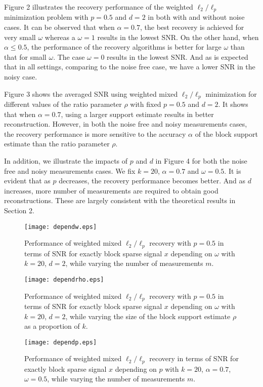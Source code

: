 \documentclass[11pt]{article}
\begin{document}
Figure 2 illustrates the recovery performance of the weighted $\ell_2/\ell_p$ minimization problem with $p=0.5$ and $d=2$ in both with and without noise cases. It can be observed that when $\alpha=0.7$, the best recovery is achieved for very small $\omega$ whereas a $\omega=1$ results in the lowest SNR. On the other hand, when $\alpha\leq 0.5$, the performance of the recovery algorithms is better for large $\omega$ than that for small $\omega$. The case $\omega=0$ results in the lowest SNR. And as is expected that in all settings, comparing to the noise free case, we have a lower SNR in the noisy case. 

Figure 3 shows the averaged SNR using weighted mixed $\ell_2/\ell_p$ minimization for different values of the ratio parameter $\rho$ with fixed $p=0.5$ and $d=2$. It shows that when $\alpha=0.7$, using a larger support estimate results in better reconstruction. However, in both the noise free and noisy measurements cases, the recovery performance is more sensitive to the accuracy $\alpha$ of the block support estimate than the ratio parameter $\rho$.

In addition, we illustrate the impacts of $p$ and $d$ in Figure 4 for both the noise free and noisy measurements cases. We fix $k=20$, $\alpha=0.7$ and $\omega=0.5$. It is evident that as $p$ decreases, the recovery performance becomes better. And as $d$ increases, more number of measurements are required to obtain good reconstructions. These are largely consistent with the theoretical results in Section 2.

\begin{figure}[htp]
	\centering
	\texttt{[image: dependw.eps]}
	\caption{Performance of weighted mixed $\ell_2/\ell_p$ recovery with $p=0.5$ in terms of SNR for exactly block sparse signal $x$ depending on $\omega$ with $k=20$, $d=2$, while varying the number of measurements $m$.}\label{fig:2}
\end{figure}

\begin{figure}[htp]
	\centering
	\texttt{[image: dependrho.eps]}
	\caption{ Performance of weighted mixed $\ell_2/\ell_p$ recovery with $p=0.5$ in terms of SNR for exactly block sparse signal $x$ depending on $\omega$ with $k=20$, $d=2$, while varying the size of the block support estimate $\rho$ as a proportion of $k$.}\label{fig:3}
\end{figure}

\begin{figure}[htp]
	\centering
	\texttt{[image: dependp.eps]}
	\caption{Performance of weighted mixed $\ell_2/\ell_p$ recovery in terms of SNR for exactly block sparse signal $x$ depending on $p$ with $k=20$, $\alpha=0.7$, $\omega=0.5$, while varying the number of measurements $m$.}\label{fig:4}
\end{figure}
\end{document}
